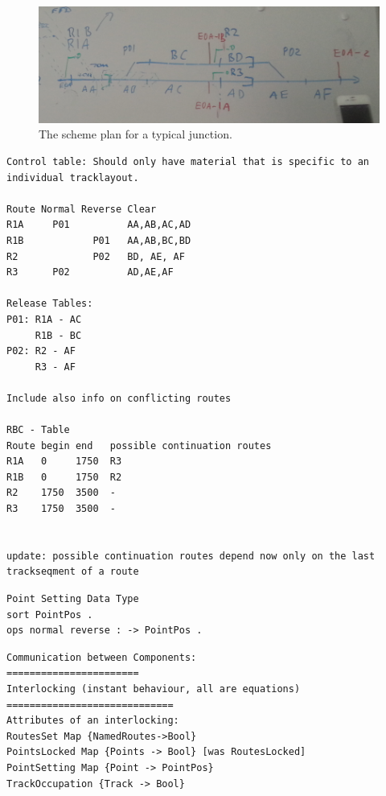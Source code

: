 \begin{figure}
\includegraphics[width=\linewidth]{trackplan.png}
\caption{The scheme plan for a typical junction.}
\label{fig:schemeplan}
\end{figure}

\begin{verbatim}
Control table: Should only have material that is specific to an individual tracklayout.

Route Normal Reverse Clear 
R1A     P01          AA,AB,AC,AD 
R1B            P01   AA,AB,BC,BD 
R2             P02   BD, AE, AF 
R3      P02          AD,AE,AF

Release Tables:
P01: R1A - AC
     R1B - BC
P02: R2 - AF
     R3 - AF

Include also info on conflicting routes

RBC - Table
Route begin end   possible continuation routes
R1A   0     1750  R3
R1B   0     1750  R2
R2    1750  3500  - 
R3    1750  3500  -


update: possible continuation routes depend now only on the last trackseqment of a route

\end{verbatim}


\begin{verbatim}
Point Setting Data Type
sort PointPos .
ops normal reverse : -> PointPos .
\end{verbatim}

\begin{verbatim}
Communication between Components:
=======================
Interlocking (instant behaviour, all are equations)
=============================
Attributes of an interlocking:
RoutesSet Map {NamedRoutes->Bool}
PointsLocked Map {Points -> Bool} [was RoutesLocked]
PointSetting Map {Point -> PointPos}
TrackOccupation {Track -> Bool}
\end{verbatim}



